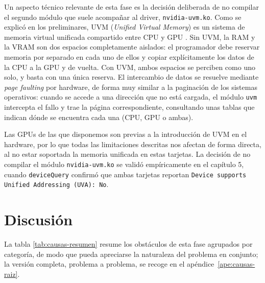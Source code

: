 Un aspecto técnico relevante de esta fase es la decisión deliberada de no compilar el segundo módulo que suele acompañar al driver, \texttt{nvidia-uvm.ko}. Como se explicó en los preliminares, UVM (\textit{Unified Virtual Memory}) es un sistema de memoria virtual unificada compartido entre CPU y GPU \cite{nvidia_uvm_docs}. Sin UVM, la RAM y la VRAM son dos espacios completamente aislados: el programador debe reservar memoria por separado en cada uno de ellos y copiar explícitamente los datos de la CPU a la GPU y de vuelta. Con UVM, ambos espacios se perciben como uno solo, y basta con una única reserva. El intercambio de datos se resuelve mediante \textit{page faulting} por hardware, de forma muy similar a la paginación de los sistemas operativos: cuando se accede a una dirección que no está cargada, el módulo \texttt{uvm} intercepta el fallo y trae la página correspondiente, consultando unas tablas que indican dónde se encuentra cada una (CPU, GPU o ambas).

Las GPUs de las que disponemos son previas a la introducción de UVM en el hardware, por lo que todas las limitaciones descritas 
nos afectan de forma directa,
al no estar soportada la memoria unificada en estas tarjetas.
La decisión de no compilar el módulo \texttt{nvidia-uvm.ko} se validó empíricamente en el capítulo 5, cuando \texttt{deviceQuery} confirmó que ambas tarjetas reportan \texttt{Device supports Unified Addressing (UVA): No}.

\section{Discusión}

La tabla \ref{tab:causas-resumen} resume los obstáculos de esta fase agrupados por categoría, de modo que pueda apreciarse la naturaleza del problema en conjunto; la versión completa, problema a problema, se recoge en el apéndice~\ref{ape:causas-raiz}.

